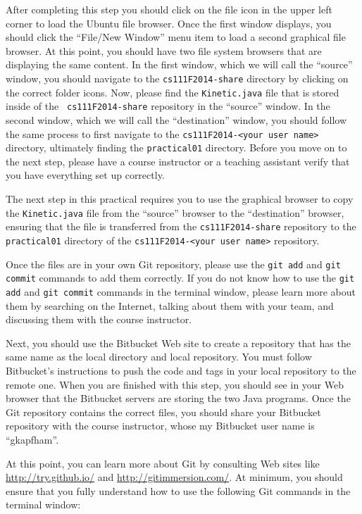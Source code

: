 After completing this step you should click on the file icon in the upper left corner to load the Ubuntu file browser.
Once the first window displays, you should click the ``File/New Window'' menu item to load a second graphical file
browser. At this point, you should have two file system browsers that are displaying the same content.  In the first
window, which we will call the ``source'' window, you should navigate to the {\tt cs111F2014-share} directory by
clicking on the correct folder icons.  Now, please find the {\tt Kinetic.java} file that is stored inside of the {\tt
  cs111F2014-share} repository in the ``source'' window. In the second window, which we will call the ``destination''
window, you should follow the same process to first navigate to the {\tt cs111F2014-<your user name>} directory,
ultimately finding the {\tt practical01} directory. Before you move on to the next step, please have a course instructor
or a teaching assistant verify that you have everything set up correctly.

The next step in this practical requires you to use the graphical browser to copy the {\tt Kinetic.java} file from the
``source'' browser to the ``destination'' browser, ensuring that the file is transferred from the {\tt cs111F2014-share}
repository to the {\tt practical01} directory of the {\tt cs111F2014-<your user name>} repository.

Once the files are in your own Git
repository, please use the {\tt git add} and {\tt git commit} commands to add them correctly. If you do not know how to
use the {\tt git add} and {\tt git commit} commands in the terminal window, please learn more about them by searching on
the Internet, talking about them with your team, and discussing them with the course instructor.

Next, you should use the Bitbucket Web site to create a repository that has the same name as the local directory and
local repository.  You must follow Bitbucket's instructions to push the code and tags in your local repository to the
remote one. When you are finished with this step, you should see in your Web browser that the Bitbucket servers are
storing the two Java programs. Once the Git repository contains the correct files, you should share your Bitbucket
repository with the course instructor, whose my Bitbucket user name is ``gkapfham''.

At this point, you can learn more about Git by consulting Web sites like \url{http://try.github.io/} and
\url{http://gitimmersion.com/}.  At minimum, you should ensure that you fully understand how to use the following Git
commands in the terminal window:

